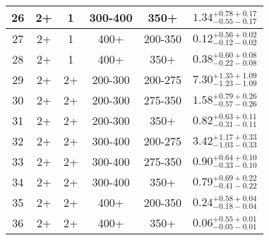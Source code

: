 \begin{table}[htbp]
\begin{centering}
\begin{lrbox}{\closureBox}
\begin{tabular}{|c|c|c|c|c||c|}
 \hline
             26 &              2+ &               1 &         300-400 &            350+ & $1.34^{+0.78 +0.17}_{-0.55 -0.17}$ \\
 \hline
             27 &              2+ &               1 &            400+ &         200-350 & $0.12^{+0.56 +0.02}_{-0.12 -0.02}$ \\
 \hline
             28 &              2+ &               1 &            400+ &            350+ & $0.38^{+0.60 +0.08}_{-0.22 -0.08}$ \\
 \hline
             29 &              2+ &              2+ &         200-300 &         200-275 & $7.30^{+1.35 +1.09}_{-1.23 -1.09}$ \\
 \hline
             30 &              2+ &              2+ &         200-300 &         275-350 & $1.58^{+0.79 +0.26}_{-0.57 -0.26}$ \\
 \hline
             31 &              2+ &              2+ &         200-300 &            350+ & $0.82^{+0.63 +0.11}_{-0.31 -0.11}$ \\
 \hline
             32 &              2+ &              2+ &         300-400 &         200-275 & $3.42^{+1.17 +0.33}_{-1.03 -0.33}$ \\
 \hline
             33 &              2+ &              2+ &         300-400 &         275-350 & $0.90^{+0.64 +0.10}_{-0.33 -0.10}$ \\
 \hline
             34 &              2+ &              2+ &         300-400 &            350+ & $0.79^{+0.69 +0.22}_{-0.41 -0.22}$ \\
 \hline
             35 &              2+ &              2+ &            400+ &         200-350 & $0.24^{+0.58 +0.04}_{-0.18 -0.04}$ \\
 \hline
             36 &              2+ &              2+ &            400+ &            350+ & $0.06^{+0.55 +0.01}_{-0.05 -0.01}$ \\
 \hline
\end{tabular}
\end{lrbox}
\scalebox{0.80}{\usebox{\closureBox}}
\par\end{centering}
\end{table}


